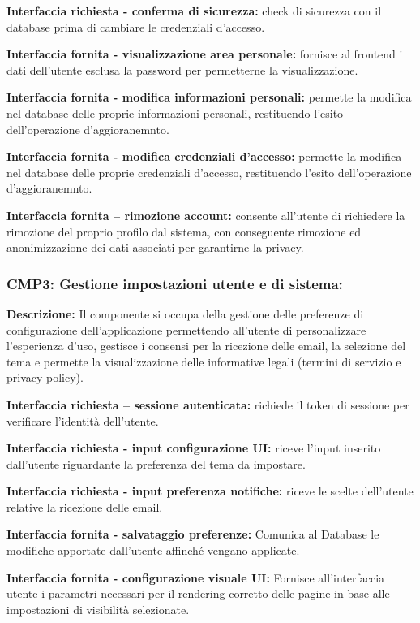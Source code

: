 \textbf{Interfaccia richiesta - conferma di sicurezza:}
check di sicurezza con il database prima di cambiare le credenziali d'accesso.

\textbf{Interfaccia fornita - visualizzazione area personale:}
fornisce al frontend i dati dell'utente esclusa la password per permetterne la visualizzazione.

\textbf{Interfaccia fornita - modifica informazioni personali:}
permette la modifica nel database delle proprie informazioni personali, restituendo l'esito
dell'operazione d'aggioranemnto.

\textbf{Interfaccia fornita - modifica credenziali d'accesso:}
permette la modifica nel database delle proprie credenziali d'accesso, restituendo l'esito
dell'operazione d'aggioranemnto.

\textbf{Interfaccia fornita – rimozione account:}
consente all’utente di richiedere la rimozione del proprio profilo dal sistema,
con conseguente rimozione ed anonimizzazione dei dati associati per garantirne la privacy.

\subsubsection*{CMP3: Gestione impostazioni utente e di sistema:}
\textbf{Descrizione:} Il componente si occupa della gestione delle preferenze di configurazione dell'applicazione
permettendo all'utente di personalizzare l'esperienza d'uso, gestisce i consensi per la ricezione delle email, la selezione del tema
e permette la visualizzazione delle informative legali (termini di servizio e privacy policy). 

\textbf{Interfaccia richiesta – sessione autenticata:}
richiede il token di sessione per verificare l'identità dell'utente.

\textbf{Interfaccia richiesta - input configurazione UI:}
riceve l'input inserito dall'utente riguardante la preferenza del tema da impostare.

\textbf{Interfaccia richiesta - input preferenza notifiche:}
riceve le scelte dell'utente relative la ricezione delle email.

\textbf{Interfaccia fornita - salvataggio preferenze:}
Comunica al Database le modifiche apportate dall'utente affinché vengano applicate.

\textbf{Interfaccia fornita - configurazione visuale UI:}
Fornisce all'interfaccia utente i parametri necessari per il rendering corretto
delle pagine in base alle impostazioni di visibilità selezionate.

